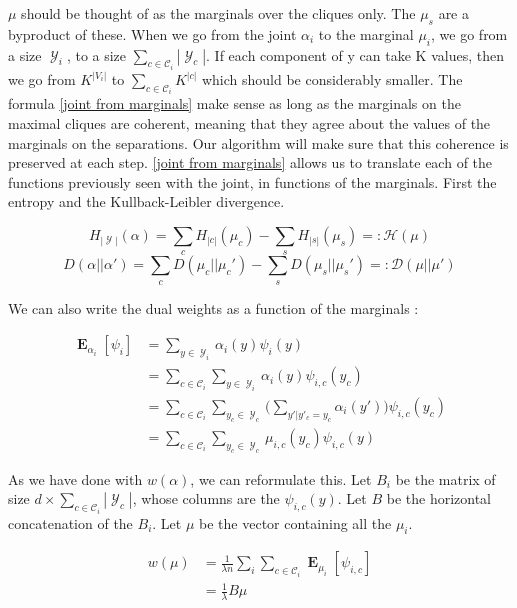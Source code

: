 \documentclass{article}
\DeclareMathOperator{\E}{\mathbf{E}}
\DeclareMathOperator{\Y}{\mathcal{Y}}
\begin{document}
$\mu$ should be thought of as the marginals over the cliques only.
The $\mu_s$ are a byproduct of these.
When we go from the joint $\alpha_i$ to the marginal $\mu_i$, we go from a size $\Y_i$, to a size $\sum_{c \in \mathcal C_i} |\Y_c|$.
If each component of y can take K values, then we go from $K^{|V_i|}$ to $\sum_{c \in \mathcal C_i} K^{|c|}$ which should be considerably smaller.
The formula \ref{joint from marginals} make sense as long as the marginals on the maximal cliques are coherent, meaning that they agree about the values of the marginals on the separations.
Our algorithm will make sure that this coherence is preserved at each step.
\ref{joint from marginals} allows us to translate each of the functions previously seen with the joint, in functions of the marginals.
First the entropy and the Kullback-Leibler divergence.

\begin{equation}
	H_{|\Y|} (\alpha) = \sum_c H_{|c|}(\mu_c) - \sum_s H_{|s|}(\mu_s) =: \mathcal H (\mu) 
	\label{marginals entropy}
\end{equation}
\begin{equation}
	D(\alpha||\alpha') = \sum_c D(\mu_c||\mu_c') - \sum_s D(\mu_s||\mu_s') =: \mathcal D (\mu||\mu')
\end{equation}

We can also write the dual weights as a function of the marginals :

\begin{align*}
	   \E_{\alpha_i}[\psi_i]
   & = \sum_{y \in \Y_i} \alpha_i(y) \psi_i(y)  \\
   &  = \sum_{c \in \mathcal C_i} \sum_{y \in \Y_i}  \alpha_i(y)  \psi_{i, c}(y_c)  \\
   & = \sum_{c \in \mathcal C_i}\sum_{y_c \in  \Y_c} \bigg ( \sum_{y'| y'_c = y_c } \alpha_i(y') \bigg ) \psi_{i, c}(y_c) \\
   & = \sum_{c \in \mathcal C_i}\sum_{y_c \in \Y_c} \mu_{i, c}(y_c)  \psi_{i, c}(y)
\end{align*}

As we have done with $w(\alpha)$, we can reformulate this.
Let  $B_i$ be the matrix of size $d \times  \sum_{c \in \mathcal C_i} |\Y_c|$, whose columns are the $\psi_{i, c}(y)$.
Let $B$ be the horizontal concatenation of the $B_i$.
Let $\mu$ be the vector containing all the $\mu_i$.

\begin{align}
	w (\mu)
	& =\frac{1}{\lambda n} \sum_i \sum_{c \in \mathcal C_i} \E_{\mu_i}[\psi_{i, c}] \\
	& = \frac{1}{\lambda} B\mu \label{marginals to primal}
\end{align}
\end{document}
